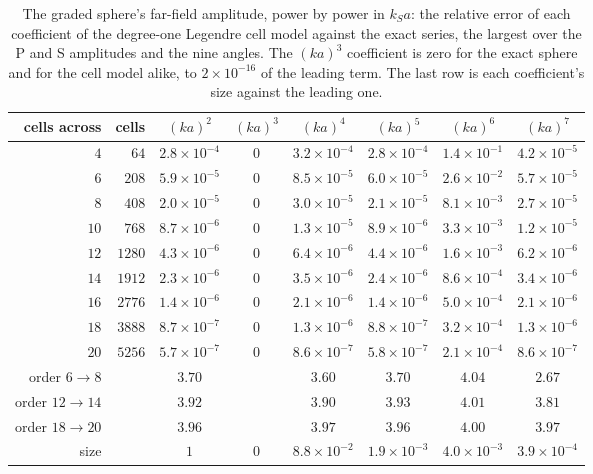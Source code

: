 \documentclass[11pt,a4paper]{article}
\begin{document}
\begin{table}[h]
\centering
\small
\begin{tabular}{rrcccccc}
\toprule
cells across & cells & $(ka)^2$ & $(ka)^3$ & $(ka)^4$ & $(ka)^5$ & $(ka)^6$ & $(ka)^7$ \\
\midrule
$4$  & $64$   & $2.8\times10^{-4}$ & $0$ & $3.2\times10^{-4}$ & $2.8\times10^{-4}$ & $1.4\times10^{-1}$ & $4.2\times10^{-5}$ \\
$6$  & $208$  & $5.9\times10^{-5}$ & $0$ & $8.5\times10^{-5}$ & $6.0\times10^{-5}$ & $2.6\times10^{-2}$ & $5.7\times10^{-5}$ \\
$8$  & $408$  & $2.0\times10^{-5}$ & $0$ & $3.0\times10^{-5}$ & $2.1\times10^{-5}$ & $8.1\times10^{-3}$ & $2.7\times10^{-5}$ \\
$10$ & $768$  & $8.7\times10^{-6}$ & $0$ & $1.3\times10^{-5}$ & $8.9\times10^{-6}$ & $3.3\times10^{-3}$ & $1.2\times10^{-5}$ \\
$12$ & $1280$ & $4.3\times10^{-6}$ & $0$ & $6.4\times10^{-6}$ & $4.4\times10^{-6}$ & $1.6\times10^{-3}$ & $6.2\times10^{-6}$ \\
$14$ & $1912$ & $2.3\times10^{-6}$ & $0$ & $3.5\times10^{-6}$ & $2.4\times10^{-6}$ & $8.6\times10^{-4}$ & $3.4\times10^{-6}$ \\
$16$ & $2776$ & $1.4\times10^{-6}$ & $0$ & $2.1\times10^{-6}$ & $1.4\times10^{-6}$ & $5.0\times10^{-4}$ & $2.1\times10^{-6}$ \\
$18$ & $3888$ & $8.7\times10^{-7}$ & $0$ & $1.3\times10^{-6}$ & $8.8\times10^{-7}$ & $3.2\times10^{-4}$ & $1.3\times10^{-6}$ \\
$20$ & $5256$ & $5.7\times10^{-7}$ & $0$ & $8.6\times10^{-7}$ & $5.8\times10^{-7}$ & $2.1\times10^{-4}$ & $8.6\times10^{-7}$ \\
\midrule
order $6\to8$   & & $3.70$ & & $3.60$ & $3.70$ & $4.04$ & $2.67$ \\
order $12\to14$ & & $3.92$ & & $3.90$ & $3.93$ & $4.01$ & $3.81$ \\
order $18\to20$ & & $3.96$ & & $3.97$ & $3.96$ & $4.00$ & $3.97$ \\
size & & $1$ & $0$ & $8.8\times10^{-2}$ & $1.9\times10^{-3}$ & $4.0\times10^{-3}$ & $3.9\times10^{-4}$ \\
\bottomrule
\end{tabular}
\caption{The graded sphere's far-field amplitude, power by power in $k_Sa$: the relative error of each
coefficient of the degree-one Legendre cell model against the exact series, the largest over the P and S
amplitudes and the nine angles. The $(ka)^3$ coefficient is zero for the exact sphere and for the cell
model alike, to $2\times10^{-16}$ of the leading term. The last row is each coefficient's size against the
leading one.}
\label{tab:sphereseries}
\end{table}
\end{document}
